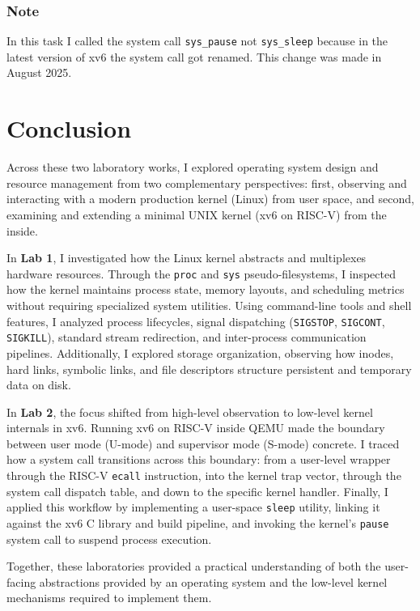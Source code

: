 \documentclass{labreport}
\begin{document}
\subsubsection*{Note}
In this task I called the system call \texttt{sys\_pause} not \texttt{sys\_sleep} because in the latest version of xv6 the system call got renamed. This change was made in August 2025.

\newpage
\section{Conclusion}

Across these two laboratory works, I explored operating system design and resource management from two complementary perspectives: first, observing and interacting with a modern production kernel (Linux) from user space, and second, examining and extending a minimal UNIX kernel (xv6 on RISC-V) from the inside.

In \textbf{Lab 1}, I investigated how the Linux kernel abstracts and multiplexes hardware resources. Through the \texttt{proc} and \texttt{sys} pseudo-filesystems, I inspected how the kernel maintains process state, memory layouts, and scheduling metrics without requiring specialized system utilities. Using command-line tools and shell features, I analyzed process lifecycles, signal dispatching (\texttt{SIGSTOP}, \texttt{SIGCONT}, \texttt{SIGKILL}), standard stream redirection, and inter-process communication pipelines. Additionally, I explored storage organization, observing how inodes, hard links, symbolic links, and file descriptors structure persistent and temporary data on disk.

In \textbf{Lab 2}, the focus shifted from high-level observation to low-level kernel internals in xv6. Running xv6 on RISC-V inside QEMU made the boundary between user mode (U-mode) and supervisor mode (S-mode) concrete. I traced how a system call transitions across this boundary: from a user-level wrapper through the RISC-V \texttt{ecall} instruction, into the kernel trap vector, through the system call dispatch table, and down to the specific kernel handler. Finally, I applied this workflow by implementing a user-space \texttt{sleep} utility, linking it against the xv6 C library and build pipeline, and invoking the kernel's \texttt{pause} system call to suspend process execution.

Together, these laboratories provided a practical understanding of both the user-facing abstractions provided by an operating system and the low-level kernel mechanisms required to implement them.
\end{document}
